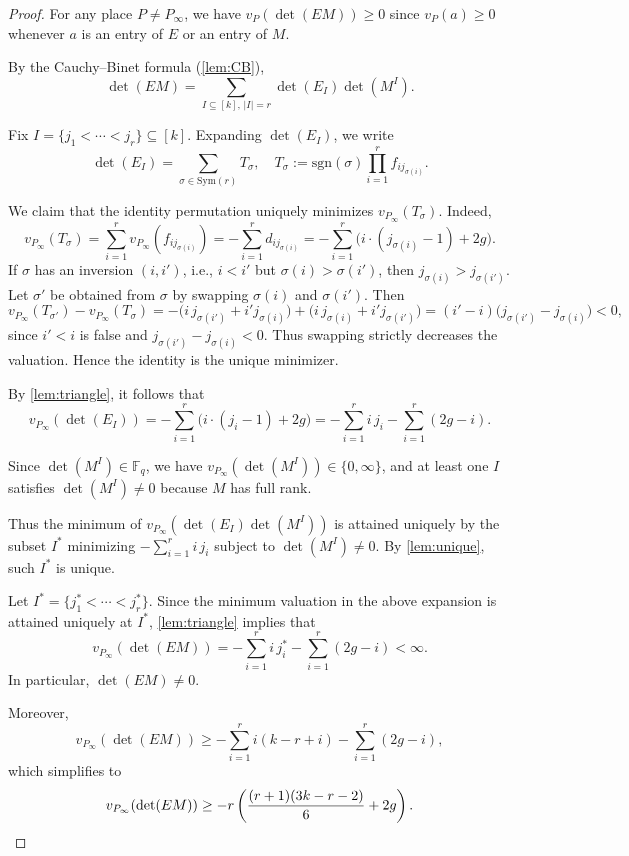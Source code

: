 \documentclass[11pt]{article}
\newcommand{\F}{\mathbb{F}}
\begin{document}
\begin{proof}
For any place $P\neq P_\infty$, we have $v_P(\det(EM))\geq 0$ since $v_P(a)\geq 0$ whenever $a$ is an entry of $E$ or an entry of $M$.

By the Cauchy--Binet formula (\cref{lem:CB}),
\[
\det(EM)=\sum_{I\subseteq [k],\, |I|=r}\det(E_I)\det(M^I).
\]

Fix $I=\{j_1<\cdots<j_r\}\subseteq [k]$. Expanding $\det(E_I)$, we write
\[
\det(E_I)=\sum_{\sigma\in \mathrm{Sym}(r)} T_\sigma,
\quad
T_\sigma:=\mathrm{sgn}(\sigma)\prod_{i=1}^r f_{i j_{\sigma(i)}}.
\]

We claim that the identity permutation uniquely minimizes $v_{P_\infty}(T_\sigma)$. Indeed,
\[
v_{P_\infty}(T_\sigma) = \sum_{i=1}^r v_{P_\infty}(f_{ij_{\sigma(i)}}) = -\sum_{i=1}^r d_{ij_{\sigma(i)}}
= -\sum_{i=1}^r \bigl(i\cdot (j_{\sigma(i)}-1)+2g\bigr).
\]
If $\sigma$ has an inversion $(i,i')$, i.e., $i<i'$ but $\sigma(i)>\sigma(i')$, then
$j_{\sigma(i)}>j_{\sigma(i')}$.
Let $\sigma'$ be obtained from $\sigma$ by swapping $\sigma(i)$ and $\sigma(i')$.
Then
\[
v_{P_\infty}(T_{\sigma'}) - v_{P_\infty}(T_\sigma)
= -\bigl(i\,j_{\sigma(i')} + i'j_{\sigma(i)}\bigr)
+ \bigl(i\,j_{\sigma(i)} + i'j_{\sigma(i')}\bigr)
= (i'-i)\bigl(j_{\sigma(i')}-j_{\sigma(i)}\bigr) < 0,
\]
since $i'<i$ is false and $j_{\sigma(i')}-j_{\sigma(i)}<0$.
Thus swapping strictly decreases the valuation. Hence the identity is the unique minimizer.

By \cref{lem:triangle}, it follows that
\[
v_{P_\infty}(\det(E_I))
= -\sum_{i=1}^r \bigl(i\cdot (j_i-1)+2g\bigr)
= -\sum_{i=1}^r i\,j_i - \sum_{i=1}^r (2g-i).
\]

Since $\det(M^I)\in \F_q$, we have $v_{P_\infty}(\det(M^I))\in \{0,\infty\}$, and at least one $I$ satisfies $\det(M^I)\neq 0$ because $M$ has full rank.

Thus the minimum of $v_{P_\infty}(\det(E_I)\det(M^I))$ is attained uniquely by the subset $I^*$ minimizing $-\sum_{i=1}^r i\,j_i$ subject to $\det(M^I)\neq 0$. By \cref{lem:unique}, such $I^*$ is unique.

Let $I^*=\{j_1^*<\cdots<j_r^*\}$. Since the minimum valuation in the above expansion is attained uniquely at $I^*$, \cref{lem:triangle} implies that
\[
v_{P_\infty}(\det(EM))
= -\sum_{i=1}^r i\,j_i^* - \sum_{i=1}^r (2g-i)
< \infty.
\]
In particular, $\det(EM)\neq 0$.

Moreover,
\[
v_{P_\infty}(\det(EM))
\ge -\sum_{i=1}^r i(k-r+i) - \sum_{i=1}^r (2g-i),
\]
which simplifies to
\[
v_{P_\infty}(\det(EM))
\ge -r\left(\frac{(r+1)(3k-r-2)}{6}+2g\right).\qedhere
\]
\end{proof}
\end{document}
